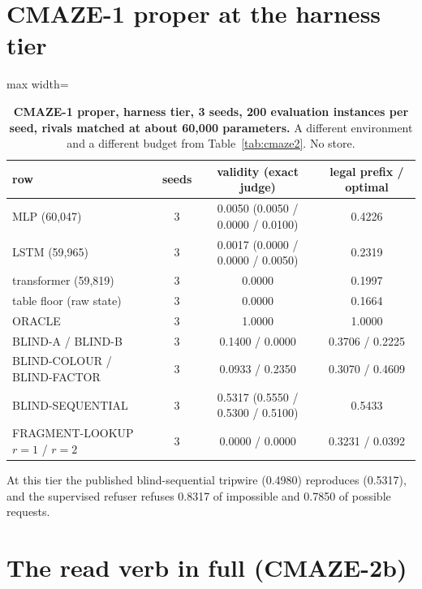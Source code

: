 \documentclass{article} %
\begin{document}
\section{CMAZE-1 proper at the harness tier}
\label{app:cmaze1}

\begin{table}[h]
\centering\small
\caption{\textbf{CMAZE-1 proper, harness tier, 3 seeds, 200 evaluation instances per seed, rivals %
matched at about 60,000 parameters.} A different environment and a different budget from %
Table~\ref{tab:cmaze2}. No store.}
\label{tab:cmaze1}
\begin{adjustbox}{max width=\linewidth}\begin{tabular}{lccc}
\toprule
row & seeds & validity (exact judge) & legal prefix / optimal \\
\midrule
MLP (60,047) & 3 & 0.0050 (0.0050 / 0.0000 / 0.0100) & 0.4226 \\
LSTM (59,965) & 3 & 0.0017 (0.0000 / 0.0000 / 0.0050) & 0.2319 \\
transformer (59,819) & 3 & 0.0000 & 0.1997 \\
table floor (raw state) & 3 & 0.0000 & 0.1664 \\
ORACLE & 3 & 1.0000 & 1.0000 \\
BLIND-A / BLIND-B & 3 & 0.1400 / 0.0000 & 0.3706 / 0.2225 \\
BLIND-COLOUR / BLIND-FACTOR & 3 & 0.0933 / 0.2350 & 0.3070 / 0.4609 \\
BLIND-SEQUENTIAL & 3 & 0.5317 (0.5550 / 0.5300 / 0.5100) & 0.5433 \\
FRAGMENT-LOOKUP $r=1$ / $r=2$ & 3 & 0.0000 / 0.0000 & 0.3231 / 0.0392 \\
\bottomrule
\end{tabular}\end{adjustbox}
\end{table}

\noindent At this tier the published blind-sequential tripwire (0.4980) reproduces (0.5317), and
the supervised refuser refuses 0.8317 of impossible and 0.7850 of possible requests.

\section{The read verb in full (CMAZE-2b)}
\label{app:verb}
\end{document}
